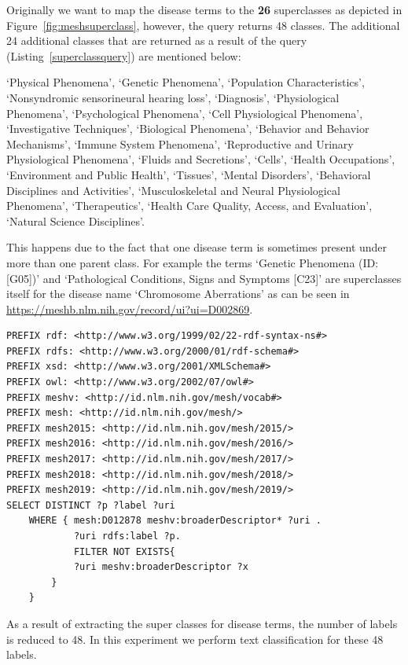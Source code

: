 Originally we want to map the disease terms to the \textbf{26} superclasses as depicted in Figure~\ref{fig:meshsuperclass}, however, the query returns 48 classes. 
The additional 24 additional classes that are returned as a result of the query (Listing~\ref{superclassquery}) are mentioned below:
\begin{spverbatim}
`Physical Phenomena', `Genetic Phenomena', `Population Characteristics', `Nonsyndromic sensorineural hearing loss', `Diagnosis', `Physiological Phenomena', `Psychological Phenomena', `Cell Physiological Phenomena', `Investigative Techniques', `Biological Phenomena', `Behavior and Behavior Mechanisms', `Immune System Phenomena', `Reproductive and Urinary Physiological Phenomena', `Fluids and Secretions', `Cells', `Health Occupations', `Environment and Public Health', `Tissues', `Mental Disorders', `Behavioral Disciplines and Activities', `Musculoskeletal and Neural Physiological Phenomena', `Therapeutics', `Health Care Quality, Access, and Evaluation', `Natural Science Disciplines'. 
\end{spverbatim}
This happens due to the fact that one disease term is sometimes present under more than one parent class. 
For example the terms `Genetic Phenomena (ID: [G05])' and `Pathological Conditions, Signs and Symptoms [C23]' are superclasses itself for the disease name `Chromosome Aberrations' as can be seen in \url{https://meshb.nlm.nih.gov/record/ui?ui=D002869}. 

\begin{lstlisting}[caption = SPARQL query to map \emph{one} disease name to the respective super class using the MeSH SPARQL endpoint (\url{https://id.nlm.nih.gov/mesh/query}), label = superclassquery]
PREFIX rdf: <http://www.w3.org/1999/02/22-rdf-syntax-ns#>
PREFIX rdfs: <http://www.w3.org/2000/01/rdf-schema#>
PREFIX xsd: <http://www.w3.org/2001/XMLSchema#>
PREFIX owl: <http://www.w3.org/2002/07/owl#>
PREFIX meshv: <http://id.nlm.nih.gov/mesh/vocab#>
PREFIX mesh: <http://id.nlm.nih.gov/mesh/>
PREFIX mesh2015: <http://id.nlm.nih.gov/mesh/2015/>
PREFIX mesh2016: <http://id.nlm.nih.gov/mesh/2016/>
PREFIX mesh2017: <http://id.nlm.nih.gov/mesh/2017/>
PREFIX mesh2018: <http://id.nlm.nih.gov/mesh/2018/>
PREFIX mesh2019: <http://id.nlm.nih.gov/mesh/2019/>
SELECT DISTINCT ?p ?label ?uri 
    WHERE { mesh:D012878 meshv:broaderDescriptor* ?uri .
            ?uri rdfs:label ?p.
            FILTER NOT EXISTS{
            ?uri meshv:broaderDescriptor ?x
        }
    }
\end{lstlisting}
As a result of extracting the super classes for disease terms, the number of labels is reduced to 48. In this experiment we perform text classification for these 48 labels.

